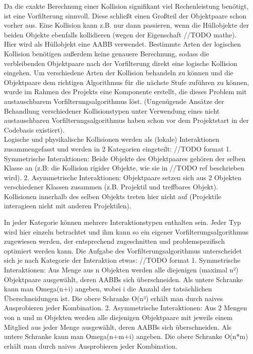 Da die exakte Berechnung einer Kollision signifikant viel Rechenleistung benötigt, ist eine Vorfilterung sinnvoll. Diese schließt einen Großteil der Objektpaare schon vorher aus. Eine Kollision kann z.B. nur dann passieren, wenn die Hüllobjekte der beiden Objekte ebenfalls kollidieren (wegen der Eigenschaft //TODO mathe). Hier wird als Hüllobjekt eine AABB verwendet. Bestimmte Arten der logischen Kollision benötigen außerdem keine genauere Berechnung, sodass die verbleibenden Objektpaare nach der Vorfilterung direkt eine logische Kollision eingehen. Um verschiedene Arten der Kollision behandeln zu können und die Objektpaare dem richtigen Algorithmus für die nächste Stufe zuführen zu können, wurde im Rahmen des Projekts eine Komponente erstellt, die dieses Problem mit austauschbarem Vorfilterungsalgorithmus löst. (Ungenügende Ansätze der Behandlung verschiedener Kollisionstypen unter Verwendung eines nicht austauschbaren Vorfilterungsalgorithmus haben schon vor dem Projektstart in der Codebasis existiert). \\
Logische und physikalische Kollisionen werden als (lokale) Interaktionen zusammengefasst und werden in 2 Kategorien eingeteilt:
//TODO format
1. Symmetrische Interaktionen: Beide Objekte des Objektpaares gehören der selben Klasse an (z.B: die Kollision rigider Objekte, wie sie in //TODO ref beschrieben wird).
2. Asymmetrische Interaktionen: Objektpaare setzen sich aus 2 Objekten verschiedener Klassen zusammen (z.B. Projektil und treffbares Objekt). Kollisionen innerhalb des selben Objekts treten hier nicht auf (Projektile interagieen nicht mit anderen Projektilen).

In jeder Kategorie können mehrere Interaktionstypen enthalten sein. Jeder Typ wird hier einzeln betrachtet und ihm kann so ein eigener Vorfilterungsalgorithmus zugewiesen werden, der entsprechend zugeschnitten und problemspezifisch optimiert werden kann.
Die Aufgabe des Vorfilterungsalgorithmus unterscheidet sich je nach Kategorie der Interaktion etwas:
//TODO format
1. Symmetrische Interaktionen: Aus Menge aus n Objekten werden alle diejenigen (maximal n²) Objektpaare ausgewählt, deren AABBs sich überschneiden. Als untere Schranke kann man Omega(n+i) angeben, wobei i die Anzahl der tatsächlichen Überschneidungen ist. Die obere Schranke O(n²) erhält man durch naives Ausprobieren jeder Kombination.
2. Asymmetrische Interaktionen: Aus 2 Mengen von n und m Objekten werden alle diejenigen Objektpaare mit jeweils einem Mitglied aus jeder Menge ausgewählt, deren AABBs sich überschneiden. Als untere Schranke kann man Omega(n+m+i) angeben. Die obere Schranke O(n*m) erhält man durch naives Ausprobieren jeder Kombination.

